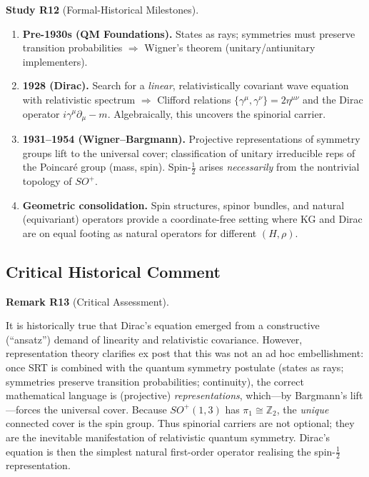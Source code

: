 \documentclass[10pt, letterpaper]{article}
\newcommand{\Z}{\mathbb{Z}}
\newcommand{\CustomHeading}[3]{%
  \par\medskip\noindent%
  \textbf{#1 #2} \textnormal{(#3)}.\enskip%
}
\newenvironment{REM}[2]{\begin{unitbox}\CustomHeading{Remark}{#1}{#2}}{\end{unitbox}}
\newenvironment{STUD}[2]{\begin{unitbox}\CustomHeading{Study}{#1}{#2}}{\end{unitbox}}
\begin{document}
\begin{STUD}{R12}{Formal-Historical Milestones}
\begin{enumerate}[label=\roman*)]
\item \textbf{Pre-1930s (QM Foundations).} States as rays; symmetries must preserve transition probabilities $\Rightarrow$ Wigner’s theorem (unitary/antiunitary implementers).
\item \textbf{1928 (Dirac).} Search for a \emph{linear}, relativistically covariant wave equation with relativistic spectrum $\Rightarrow$ Clifford relations $\{\gamma^\mu,\gamma^\nu\}=2\eta^{\mu\nu}$ and the Dirac operator $i\gamma^\mu\partial_\mu-m$. Algebraically, this uncovers the spinorial carrier.
\item \textbf{1931--1954 (Wigner--Bargmann).} Projective representations of symmetry groups lift to the universal cover; classification of unitary irreducible reps of the Poincaré group (mass, spin). Spin-$\tfrac12$ arises \emph{necessarily} from the nontrivial topology of $SO^+$.
\item \textbf{Geometric consolidation.} Spin structures, spinor bundles, and natural (equivariant) operators provide a coordinate-free setting where KG and Dirac are on equal footing as natural operators for different $(H,\rho)$.
\end{enumerate}
\end{STUD}

\subsection{Critical Historical Comment}

\begin{REM}{R13}{Critical Assessment}
It is historically true that Dirac’s equation emerged from a constructive (``ansatz'') demand of linearity and relativistic covariance. However, representation theory clarifies ex post that this was not an ad hoc embellishment: once SRT is combined with the quantum symmetry postulate (states as rays; symmetries preserve transition probabilities; continuity), the correct mathematical language is (projective) \emph{representations}, which—by Bargmann’s lift—forces the universal cover. Because $SO^+(1,3)$ has $\pi_1\cong\Z_2$, the \emph{unique} connected cover is the spin group. Thus spinorial carriers are not optional; they are the inevitable manifestation of relativistic quantum symmetry. Dirac’s equation is then the simplest natural first-order operator realising the spin-$\tfrac12$ representation.
\end{REM}
\end{document}
